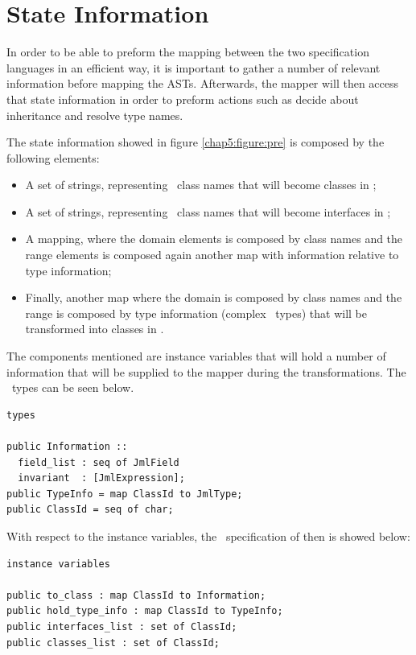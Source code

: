 \section{State Information}
\label{chap5:state}

In order to be able to preform the mapping between the two specification languages in an efficient way, it is important to gather a number of relevant information before mapping the ASTs. Afterwards, the mapper will then access that state information in order to preform actions such as decide about inheritance and resolve type names.

The state information showed in figure \ref{chap5:figure:pre} is composed by the following elements:
\begin{itemize}
\item A set of strings, representing \vpp\ class names that will become classes in \jml ;
\item A set of strings, representing \vpp\ class names that will become interfaces in \jml ;
\item A mapping, where the domain elements is composed by class names and the range elements is composed again another map with information relative to type information;
\item Finally, another map where the domain is composed by class names and the range is composed by type information (complex \vpp\ types) that will be transformed into classes in \jml .
\end{itemize}
The components mentioned are instance variables that will hold a number of information that will be supplied to the mapper during the transformations. The \vpp\ types can be seen below.
\lstset{style=AST}
\bigskip
\begin{lstlisting}
types

public Information ::
  field_list : seq of JmlField
  invariant  : [JmlExpression];
public TypeInfo = map ClassId to JmlType;
public ClassId = seq of char;
\end{lstlisting}
\bigskip

With respect to the instance variables, the \vpp\ specification of then is showed below:

\bigskip
\begin{lstlisting}
instance variables

public to_class : map ClassId to Information;
public hold_type_info : map ClassId to TypeInfo;
public interfaces_list : set of ClassId;
public classes_list : set of ClassId;
\end{lstlisting}
\bigskip

